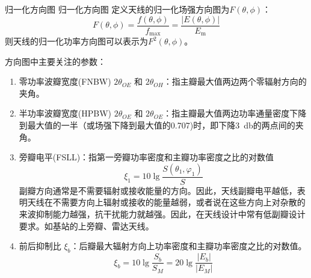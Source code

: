     \begin{definition}
    {归一化方向图}
    {归一化方向图}
        定义天线的归一化场强方向图为$F(\theta,\phi)$：
        \begin{equation}
            F(\theta,\phi)
            =\frac{f(\theta,\phi)}{f_\mathrm{max}}
            =\frac{|E(\theta,\phi)|}{E_\mathrm{m}}
        \end{equation}
        则天线的归一化功率方向图可以表示为$F^2(\theta,\phi)$。
    \end{definition}


        
        方向图中主要关注的参数：
        \begin{enumerate}
            \item 零功率波瓣宽度(FNBW) $2\theta_{OE}$ 和 $2\theta_{OH}$：指主瓣最大值两边两个零辐射方向的夹角。
            \item 半功率波瓣宽度(HPBW) $2\theta_{OE}$ 和 $2\theta_{OE}$：指主瓣最大值两边功率通量密度下降到最大值的一半（或场强下降到最大值的0.707)时，即下降\SI{3}{\decibel}的两点间的夹角。
            \item 旁瓣电平(FSLL)：指第一旁瓣功率密度和主瓣功率密度之比的对数值
                \begin{equation}
                    \xi_1=10\lg\frac{S(\theta_1,\varphi_1)}{S} 
                \end{equation}
            副瓣方向通常是不需要辐射或接收能量的方向。因此，天线副瓣电平越低，表明天线在不需要方向上辐射或接收的能量越弱，或者说在这些方向上对杂散的来波抑制能力越强，抗干扰能力就越强。因此，在天线设计中常有低副瓣设计要求。如基站的上旁瓣、雷达天线。
            
            \item 前后抑制比 $\xi_b$：后瓣最大辐射方向上功率密度和主瓣功率密度之比的对数值。
                \begin{equation}
                    \xi_b=10\lg\frac{S_b}{S_M}=20\lg\frac{|E_b|}{|E_M|}
                \end{equation}
        \end{enumerate}

